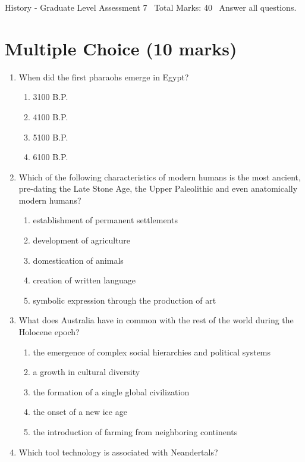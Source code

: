 \documentclass[12pt]{article}
\begin{document}
\begin{center}
History - Graduate Level Assessment 7 \
Total Marks: 40 \
Answer all questions.
\end{center}

\section*{Multiple Choice (10 marks)}
\begin{enumerate}[label=\arabic*.]
\item When did the first pharaohs emerge in Egypt?
\begin{enumerate}[label=(\alph*)]
    \item 3100 B.P.
    \item 4100 B.P.
    \item 5100 B.P.
    \item 6100 B.P.
\end{enumerate}
\item Which of the following characteristics of modern humans is the most ancient, pre-dating the Late Stone Age, the Upper Paleolithic and even anatomically modern humans?
\begin{enumerate}[label=(\alph*)]
    \item establishment of permanent settlements
    \item development of agriculture
    \item domestication of animals
    \item creation of written language
    \item symbolic expression through the production of art
\end{enumerate}
\item What does Australia have in common with the rest of the world during the Holocene epoch?
\begin{enumerate}[label=(\alph*)]
    \item the emergence of complex social hierarchies and political systems
    \item a growth in cultural diversity
    \item the formation of a single global civilization
    \item the onset of a new ice age
    \item the introduction of farming from neighboring continents
\end{enumerate}
\item Which tool technology is associated with Neandertals?
\begin{enumerate}[label=(\alph*)]

\end{enumerate}
\end{enumerate}
\end{document}
